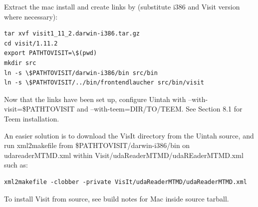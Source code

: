 \documentclass[12pt]{article}
\begin{document}
Extract the mac install and create links by (substitute i386 and Visit version where necessary):

\begin{verbatim}
tar xvf visit1_11_2.darwin-i386.tar.gz
cd visit/1.11.2
export PATHTOVISIT=\$(pwd)
mkdir src
ln -s \$PATHTOVISIT/darwin-i386/bin src/bin
ln -s \$PATHTOVISIT/../bin/frontendlaucher src/bin/visit
\end{verbatim}

Now that the links have been set up, configure Uintah with --with-visit=\$PATHTOVISIT and --with-teem=DIR/TO/TEEM.  See Section 8.1 for Teem installation.

An easier solution is to download the VisIt directory from the Uintah source, and run xml2makefile from \$PATHTOVISIT/darwin-i386/bin on udareaderMTMD.xml within Visit/udaReaderMTMD/udaREaderMTMD.xml such as:

\begin{verbatim}
xml2makefile -clobber -private VisIt/udaReaderMTMD/udaReaderMTMD.xml
\end{verbatim}

To install Visit from source, see build notes for Mac inside source tarball.
\end{document}
